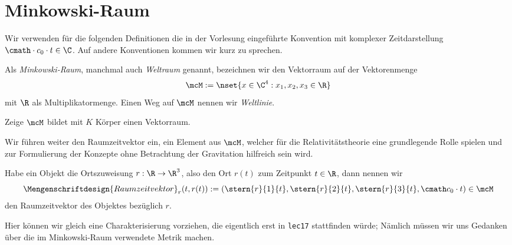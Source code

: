 \documentclass[../WiSe22ANA3.tex]{subfiles}
\begin{document}
		\section{Minkowski-Raum}
			Wir verwenden für die folgenden Definitionen die in der Vorlesung eingeführte Konvention mit komplexer Zeitdarstellung $\cmath\cdot c_0\cdot t\in\C$. Auf andere Konventionen kommen wir kurz zu sprechen.  
			\begin{info}[Minkowskivektormenge]
				Als \emph{Minkowski-Raum}, manchmal auch \emph{Weltraum} genannt, bezeichnen wir den Vektorraum auf der Vektorenmenge
				$$\mcM:=\nset{x\in\C^4:x_1,x_2,x_3\in\R}$$
				mit $\R$ als Multiplikatormenge. Einen Weg auf $\mcM$ nennen wir \emph{Weltlinie}. 
			\end{info}
			\begin{Aufgabe}
				\nr Zeige $\mcM$ bildet mit $K$ Körper einen Vektorraum. 
			\end{Aufgabe}
			\noindent Wir führen weiter den Raumzeitvektor ein, ein Element aus $\mcM$, welcher für die Relativitätstheorie eine grundlegende Rolle spielen und zur Formulierung der Konzepte ohne Betrachtung der Gravitation hilfreich sein wird.
			\begin{info}
				Habe ein Objekt die Ortszuweisung $r:\R\to\R^3$, also den Ort $r(t)$ zum Zeitpunkt $t\in\R$, dann nennen wir
				$$\Mengenschriftdesign{Raumzeitvektor}_{r}(t,r(t)):=(\stern{r}{1}{t},\stern{r}{2}{t},\stern{r}{3}{t},\cmath c_0\cdot t)\in\mcM$$
				den Raumzeitvektor des Objektes bezüglich $r$.  
			\end{info}
			\noindent Hier können wir gleich eine Charakterisierung vorziehen, die eigentlich erst in \texttt{lec17} stattfinden würde; Nämlich müssen wir uns Gedanken über die im Minkowski-Raum verwendete Metrik machen. 
\end{document}
